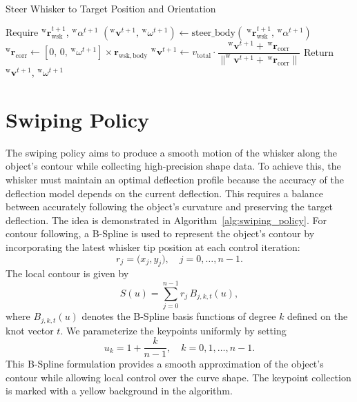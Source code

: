 \begin{algorithm}[htb]
    \caption{Steer Whisker to Target Position and Orientation}
    \begin{algorithmic}[1]
        \State Require \(^{\mathrm{w}}\boldsymbol{r}_{\mathrm{wsk}}^{t+1}\), \(^{\mathrm{w}}\alpha^{t+1}\)
        \State \((^{\mathrm{w}}\boldsymbol{v}^{t+1},\, ^{\mathrm{w}}\omega^{t+1}) \gets \mathrm{steer\_body}(\;^{\mathrm{w}}\boldsymbol{r}_{\mathrm{wsk}}^{t+1},\, ^{\mathrm{w}}\alpha^{t+1})\)
        \State \(^{\mathrm{w}}\boldsymbol{r}_{\mathrm{corr}} \gets [0,\,0,\,^{\mathrm{w}}\omega^{t+1}] \times \boldsymbol{r}_{\mathrm{wsk, body}}\) 
        \State \(^{\mathrm{w}}\boldsymbol{v}^{t+1} \gets v_{\mathrm{total}} \cdot \dfrac{^{\mathrm{w}}\boldsymbol{v}^{t+1} + \,^{\mathrm{w}}\boldsymbol{r}_{\mathrm{corr}}}{\|^{\mathrm{w}}\boldsymbol{v}^{t+1} + \,^{\mathrm{w}}\boldsymbol{r}_{\mathrm{corr}}\|}\)
        \State Return \(^{\mathrm{w}}\boldsymbol{v}^{t+1}\), \(^{\mathrm{w}}\omega^{t+1}\)
    \end{algorithmic}
    \label{alg:steer_whisker}
\end{algorithm}


\section{Swiping Policy}

The swiping policy aims to produce a smooth motion of the whisker along the object's contour while collecting high-precision shape data.
To achieve this, the whisker must maintain an optimal deflection profile because the accuracy of the deflection model depends on the current deflection.
This requires a balance between accurately following the object's curvature and preserving the target deflection.
The idea is demonstrated in Algorithm~\ref{alg:swiping_policy}.
For contour following, a B-Spline is used to represent the object's contour by incorporating the latest whisker tip position at each control iteration:
\[
    r_j = \bigl(x_j,y_j\bigr), \quad j=0,\dots,n-1.
\]
The local contour is given by
\[
    S(u) = \sum_{j=0}^{n-1} r_j \, B_{j,k,t}(u),
\]
where \(B_{j,k,t}(u)\) denotes the B-Spline basis functions of degree \(k\) defined on the knot vector \(t\).
We parameterize the keypoints uniformly by setting
\[
    u_k = 1 + \frac{k}{n-1}, \quad k=0,1,\dots,n-1.
\]
This B-Spline formulation provides a smooth approximation of the object's contour while allowing local control over the curve shape.
The keypoint collection is marked with a yellow background in the algorithm.


